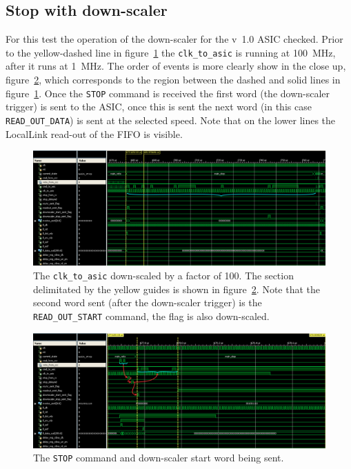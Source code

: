 \subsection{Stop with down-scaler} %
\label{sec:stop_downscaler}
For this test the operation of the down-scaler for the v~1.0 ASIC checked. Prior to the yellow-dashed line in figure~\ref{fig:isim_stop-downscaler} the \texttt{clk\_to\_asic} is running at 100~MHz, after it runs at 1~MHz. The order of events is more clearly show in the close up, figure~\ref{fig:isim_stop-downscaler-zoom}, which corresponds to the region between the dashed and solid lines in figure~\ref{fig:isim_stop-downscaler}. Once the \texttt{STOP} command is received the first word (the down-scaler trigger) is sent to the ASIC, once this is sent the next word (in this case \texttt{READ\_OUT\_DATA}) is sent at the selected speed. Note that on the lower lines the LocalLink read-out of the FIFO is visible.

\begin{figure}[htbp]
  \centering
  \includegraphics[width=\textwidth]{images/isim/edited/stop-downscaler.png}
  \caption{The \texttt{clk\_to\_asic} down-scaled by a factor of 100. The section delimitated by the yellow guides is shown in figure~\ref{fig:isim_stop-downscaler-zoom}. Note that the second word sent (after the down-scaler trigger) is the \texttt{READ\_OUT\_START} command, the flag is also down-scaled.}
  \label{fig:isim_stop-downscaler}
\end{figure}
    
\begin{figure}[htbp]
  \centering  
  \includegraphics[width=\textwidth]{images/isim/edited/stop-downscaler-zoom.png}
  \caption{The \texttt{STOP} command and down-scaler start word being sent. }
  \label{fig:isim_stop-downscaler-zoom}
\end{figure}
